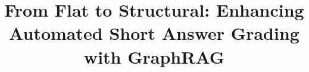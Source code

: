 \documentclass{edm_article}
\begin{document}
\title{From Flat to Structural: Enhancing Automated Short Answer Grading with GraphRAG}


%
%
%
%
\end{document}
